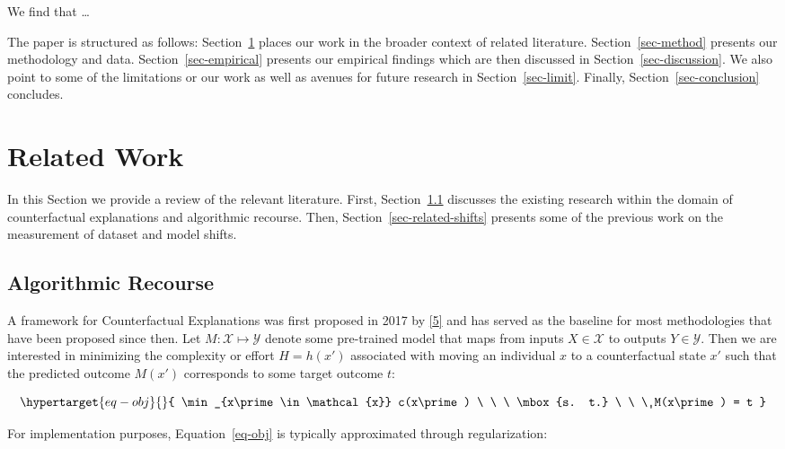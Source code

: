 \documentclass[
  conference]{IEEEtran}
\begin{document}
We find that \ldots{}

The paper is structured as follows: Section~\ref{sec-related} places our
work in the broader context of related literature.
Section~\ref{sec-method} presents our methodology and data.
Section~\ref{sec-empirical} presents our empirical findings which are
then discussed in Section~\ref{sec-discussion}. We also point to some of
the limitations or our work as well as avenues for future research in
Section~\ref{sec-limit}. Finally, Section~\ref{sec-conclusion}
concludes.

\hypertarget{sec-related}{%
\section{Related Work}\label{sec-related}}

In this Section we provide a review of the relevant literature. First,
Section~\ref{sec-related-recourse} discusses the existing research
within the domain of counterfactual explanations and algorithmic
recourse. Then, Section~\ref{sec-related-shifts} presents some of the
previous work on the measurement of dataset and model shifts.

\hypertarget{sec-related-recourse}{%
\subsection{Algorithmic Recourse}\label{sec-related-recourse}}

A framework for Counterfactual Explanations was first proposed in 2017
by \protect\hyperlink{ref-wachter2017counterfactual}{{[}5{]}} and has
served as the baseline for most methodologies that have been proposed
since then. Let \(M: \mathcal{X} \mapsto \mathcal{Y}\) denote some
pre-trained model that maps from inputs \(X \in \mathcal{X}\) to outputs
\(Y \in \mathcal{Y}\). Then we are interested in minimizing the
complexity or effort \(H=h(x\prime)\) associated with moving an
individual \(x\) to a counterfactual state \(x\prime\) such that the
predicted outcome \(M(x\prime)\) corresponds to some target outcome
\(t\):

\begin{equation}\protect\hypertarget{eq-obj}{}{
\min_{x\prime \in \mathcal{x}} c(x\prime) \ \ \ \mbox{s. t.} \ \ \ M(x\prime) = t
}\label{eq-obj}\end{equation}

For implementation purposes, Equation~\ref{eq-obj} is typically
approximated through regularization:
\end{document}
